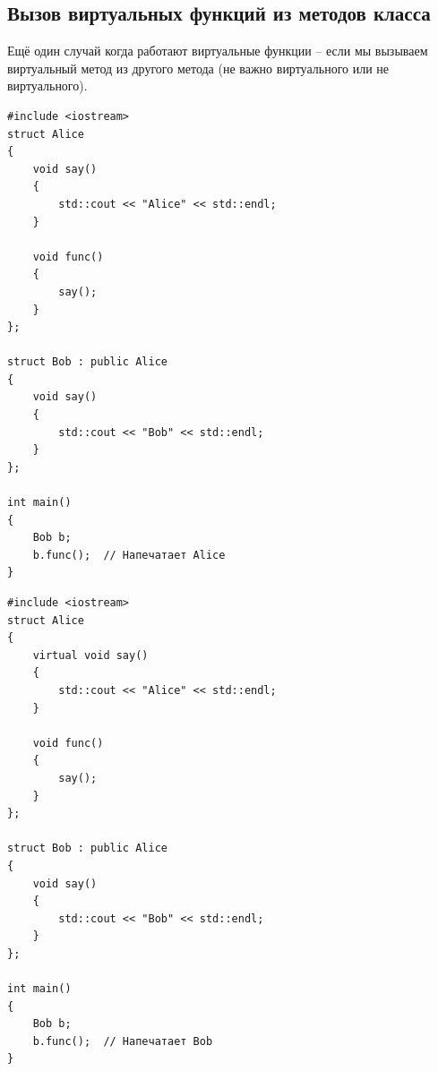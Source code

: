 \documentclass{article}
\begin{document}
\newpage
\subsection*{Вызов виртуальных функций из методов класса}
Ещё один случай когда работают виртуальные функции -- если мы вызываем виртуальный метод из другого метода (не важно виртуального или не виртуального).

\begin{multicols}{2}\noindent
\begin{lstlisting}[style=csMiptCppBorderStyle]
#include <iostream>
struct Alice 
{
    void say() 
    {
    	std::cout << "Alice" << std::endl;
    }    
    
    void func() 
    {
    	say();
    }
};

struct Bob : public Alice 
{
    void say() 
    {
    	std::cout << "Bob" << std::endl;
    }
};

int main() 
{
    Bob b;
	b.func();  // Напечатает Alice
}
\end{lstlisting}


\begin{lstlisting}[style=csMiptCppBorderStyle]
#include <iostream>
struct Alice 
{
    virtual void say() 
    {
    	std::cout << "Alice" << std::endl;
    }    
    
    void func() 
    {
    	say();
    }
};

struct Bob : public Alice 
{
    void say() 
    {
    	std::cout << "Bob" << std::endl;
    }
};

int main() 
{
    Bob b;
	b.func();  // Напечатает Bob
}
\end{lstlisting}
\end{multicols}

\newpage
\end{document}
